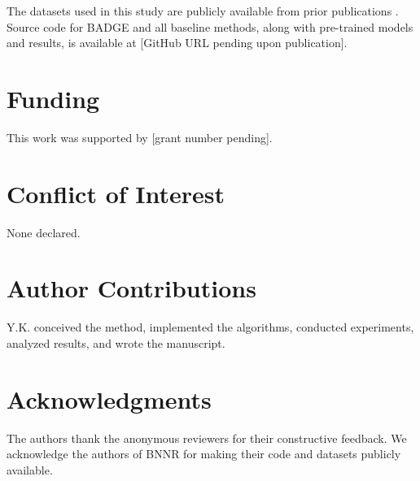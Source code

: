 \documentclass{oup-authoring-template}
\begin{document}
The datasets used in this study are publicly available from prior publications \cite{yang2019,luo2016}. Source code for BADGE and all baseline methods, along with pre-trained models and results, is available at [GitHub URL pending upon publication].

\section*{Funding}

This work was supported by [grant number pending].

\section*{Conflict of Interest}

None declared.

\section*{Author Contributions}

Y.K. conceived the method, implemented the algorithms, conducted experiments, analyzed results, and wrote the manuscript.

\section*{Acknowledgments}

The authors thank the anonymous reviewers for their constructive feedback. We acknowledge the authors of BNNR \cite{yang2019} for making their code and datasets publicly available.



\end{document}
